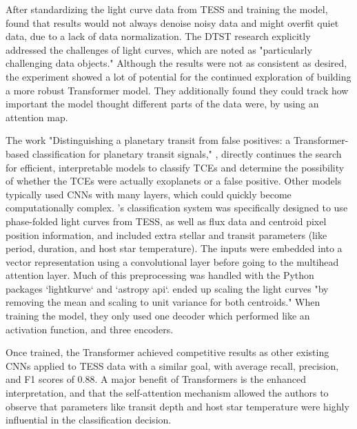 \documentclass[letterpaper]{article} %
\begin{document}
After standardizing the light curve data from TESS and training the model, \citeauthor{morvan2022dontpayattentionnoise} found that results would not always denoise noisy data and might overfit quiet data, due to a lack of data normalization. The DTST research explicitly addressed the challenges of light curves, which are noted as "particularly challenging data objects." Although the results were not as consistent as desired, the experiment showed a lot of potential for the continued exploration of building a more robust Transformer model. They additionally found they could track how important the model thought different parts of the data were, by using an attention map.

The work "Distinguishing a planetary transit from false positives: a Transformer-based classification for planetary transit signals," \cite{salinas2023distinguishingtransitfalsepositives}, directly continues the search for efficient, interpretable models to classify TCEs and determine the possibility of whether the TCEs were actually exoplanets or a false positive. Other models typically used CNNs with many layers, which could quickly become computationally complex. \citeauthor{salinas2023distinguishingtransitfalsepositives}'s classification system was specifically designed to use phase-folded light curves from TESS, as well as flux data and centroid pixel position information, and included extra stellar and transit parameters (like period, duration, and host star temperature). The inputs were embedded into a vector representation using a convolutional layer before going to the multihead attention layer. Much of this preprocessing was handled with the Python packages `lightkurve` and `astropy api`. \citeauthor{salinas2023distinguishingtransitfalsepositives} ended up scaling the light curves "by removing the mean and scaling to unit variance for both centroids." When training the model, they only used one decoder which performed like an activation function, and three encoders.

Once trained, the Transformer achieved competitive results as other existing CNNs applied to TESS data with a similar goal, with average recall, precision, and F1 scores of 0.88. A major benefit of Transformers is the enhanced interpretation, and that the self-attention mechanism allowed the authors to observe that parameters like transit depth and host star temperature were highly influential in the classification decision.
\end{document}
